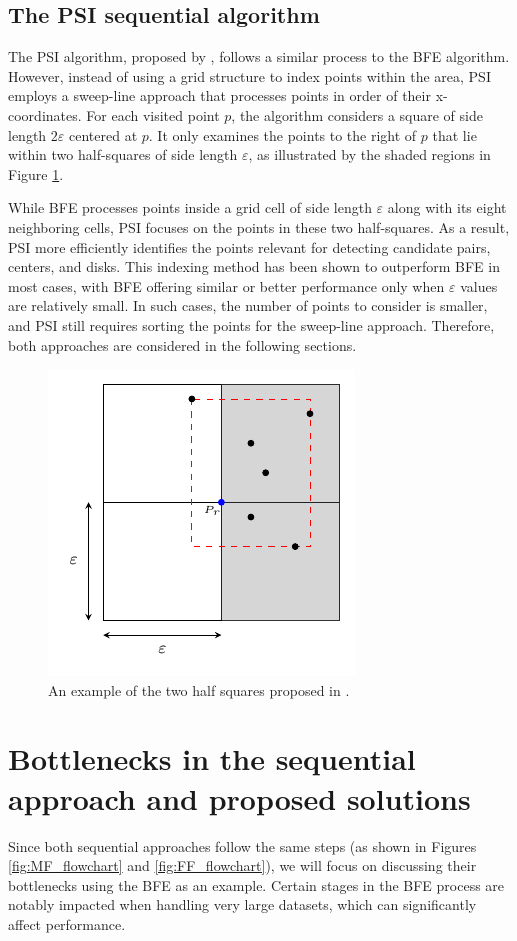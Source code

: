 \subsection{The PSI sequential algorithm}
The PSI algorithm, proposed by \cite{tanaka_improved_2016}, follows a similar process to the BFE algorithm. However, instead of using a grid structure to index points within the area, PSI employs a sweep-line approach that processes points in order of their x-coordinates. For each visited point $p$, the algorithm considers a square of side length $2\varepsilon$ centered at $p$. It only examines the points to the right of $p$ that lie within two half-squares of side length $\varepsilon$, as illustrated by the shaded regions in Figure \ref{fig:square}. 

While BFE processes points inside a grid cell of side length $\varepsilon$ along with its eight neighboring cells, PSI focuses on the points in these two half-squares. As a result, PSI more efficiently identifies the points relevant for detecting candidate pairs, centers, and disks. This indexing method has been shown to outperform BFE in most cases, with BFE offering similar or better performance only when $\varepsilon$ values are relatively small. In such cases, the number of points to consider is smaller, and PSI still requires sorting the points for the sweep-line approach. Therefore, both approaches are considered in the following sections.

\begin{figure}
    \centering
    \includegraphics[width=0.5\linewidth]{chapter4/figures/square.pdf}
    \caption{An example of the two half squares proposed in \cite{tanaka_improved_2016}.}\label{fig:square}
\end{figure}

\section{Bottlenecks in the sequential approach and proposed solutions} \label{spatial_phase}
Since both sequential approaches follow the same steps (as shown in Figures \ref{fig:MF_flowchart} and \ref{fig:FF_flowchart}), we will focus on discussing their bottlenecks using the BFE as an example. Certain stages in the BFE process are notably impacted when handling very large datasets, which can significantly affect performance.

